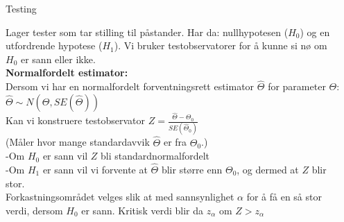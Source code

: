 \documentclass[final,hyperref={pdfpagelabels=false}]{beamer}
\begin{document}
\begin{frame}{}
\begin{columns}[t]
\begin{column}{.25\linewidth}
		\end{column}
		\begin{column}{.25\linewidth}
			\begin{block}{\center\normalsize Testing}
				{\footnotesize\raggedright
					Lager tester som tar stilling til påstander. Har da: nullhypotesen ($H_0$) og en utfordrende hypotese ($H_1$). Vi bruker testobservatorer for å kunne si nø om $H_0$ er sann eller ikke.\\
					\textbf{Normalfordelt estimator:}\\
					Dersom vi har en normalfordelt forventningsrett estimator $\hat\Theta$ for parameter $\Theta$: $\hat\Theta\sim N(\Theta,SE(\hat\Theta))$\\
					Kan vi konstruere testobservator $Z=\frac{\hat\Theta-\Theta_0}{SE(\hat\Theta_0)}$\\
					(Måler hvor mange standardavvik $\hat\Theta$ er fra $\Theta_0$.)\\
					-Om $H_0$ er sann vil $Z$ bli standardnormalfordelt\\
					-Om $H_1$ er sann vil vi forvente at $\hat\Theta$ blir større enn $\Theta_0$, og dermed at $Z$ blir stor.\\
					Forkastningsområdet velges slik at med sannsynlighet $\alpha$ for å få en så stor verdi, dersom $H_0$ er sann. Kritisk verdi blir da $z_\alpha$ om $Z>z_\alpha$\\
}
\end{block}
\end{column}
\end{columns}
\end{frame}
\end{document}
